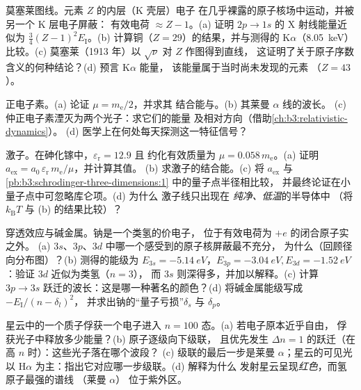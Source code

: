 \begin{exercise}[$\star\star$]\label{exo:b3:hydrogen-atom:5}
莫塞莱图线。元素 $Z$ 的内层（K 壳层）电子
在几乎裸露的原子核场中运动，并被另一个 K 层电子屏蔽：
有效电荷 $\approx Z - 1$。(a) 证明 $2p \to 1s$ 的
X 射线能量近似为 $\tfrac34(Z-1)^2E_{\text{I}}$。(b)
计算铜（$Z = 29$）的结果，并与测得的
K$\alpha$（\qty{8.05}{keV}）比较。(c) 莫塞莱（1913 年）以 $\sqrt{\nu}$ 对 $Z$ 作图得到直线，
这证明了关于原子序数含义的何种结论？(d) 预言 K$\alpha$ 能量，
该能量属于当时尚未发现的元素
（$Z = 43$）。
\end{exercise}

\begin{exercise}[$\star\star$]\label{exo:b3:hydrogen-atom:6}
正电子素。(a) 论证 $\mu = m_{\text{e}}/2$，并求其
结合能与。(b) 其莱曼 $\alpha$ 线的波长。
(c) 仲正电子素湮灭为两个光子：求它们的能量
及相对方向（借助\cref{ch:b3:relativistic-dynamics}）。
(d) 医学上在何处每天探测这一特征信号？
\end{exercise}

\begin{exercise}[$\star\star$]\label{exo:b3:hydrogen-atom:7}
激子。在砷化镓中，$\varepsilon_{\text{r}} = 12.9$ 且
约化有效质量为 $\mu = 0.058\,m_{\text{e}}$。(a) 证明
$a_{\text{ex}} = a_0\,\varepsilon_{\text{r}}\,m_{\text{e}}/\mu$，并计算其值。
(b) 求激子的结合能。(c) 将 $a_{\text{ex}}$ 与
\cref{pb:b3:schrodinger-three-dimensions:1} 中的量子点半径相比较，
并最终论证在小量子点中可忽略库仑项。(d) 为什么
激子线只出现在
\emph{纯净、低温}的半导体中
（将 $k_{\text{B}}T$ 与 (b) 的结果比较）？
\end{exercise}

\begin{exercise}[$\star\star$]\label{exo:b3:hydrogen-atom:8}
穿透效应与碱金属。钠是一个类氢的价电子，
位于有效电荷为 $+e$ 的闭合原子实之外。
(a) $3s$、$3p$、$3d$ 中哪一个感受到的原子核屏蔽最不充分，
为什么（回顾径向分布图）？(b) 测得的能级为
$E_{3s} = \qty{-5.14}{eV}$，$E_{3p} = \qty{-3.04}{eV},
E_{3d} = \qty{-1.52}{eV}$：验证 $3d$ 近似为类氢（$n = 3$），
而 $3s$ 则深得多，并加以解释。(c) 计算
$3p \to 3s$ 跃迁的波长：这是哪一种著名的颜色？(d) 将碱金属能级写成
$-E_{\text{I}}/(n - \delta_l)^2$，
并求出钠的“量子亏损”$\delta_s$ 与 $\delta_p$。
\end{exercise}

\begin{exercise}[$\star\star$]\label{exo:b3:hydrogen-atom:9}
星云中的一个质子俘获一个电子进入 $n = 100$ 态。(a) 若电子原本近乎自由，
俘获光子中释放多少能量？(b) 原子逐级向下级联，
且优先发生
$\Delta n = 1$ 的跃迁（在高 $n$ 时）：这些光子落在哪个波段？
(c) 级联的最后一步是莱曼 $\alpha$；星云的可见光
以 H$\alpha$ 为主：指出它对应哪一步级联。(d) 解释为什么
发射星云呈现\emph{红色}，而氢原子最强的谱线
（莱曼 $\alpha$）
位于紫外区。
\end{exercise}

